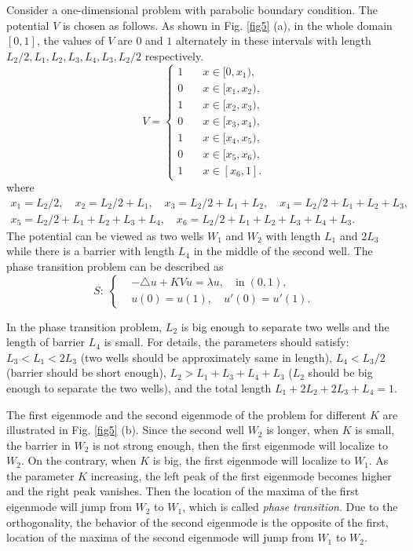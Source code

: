 \documentclass[a4paper,11pt]{article}
\begin{document}
Consider a one-dimensional problem with parabolic boundary condition. The potential $V$ is chosen as follows. As shown in Fig. \ref{fig5} (a), in the whole domain $[0,1]$, the values of $V$ are $0$ and $1$ alternately in these intervals with length $L_2/2, L_1, L_2, L_3, L_4, L_3, L_2/2$ respectively.
\begin{equation}
V = \left\{
\begin{split}
1 & \quad x \in [0, x_1), \\
0 & \quad x \in [x_1, x_2), \\
1 & \quad x \in [x_2, x_3), \\
0 & \quad x \in [x_3, x_4), \\
1 & \quad x \in [x_4, x_5), \\
0 & \quad x \in [x_5, x_6), \\
1 & \quad x \in [x_6, 1].
\end{split}
\right.
\end{equation}
where
\begin{equation}
\begin{split}
x_1 = L_2/2, \quad x_2 = L_2/2 + L_1, \quad x_3 = L_2/2 + L_1 + L_2, \quad x_4 = L_2/2 + L_1 + L_2 + L_3, \\
x_5 = L_2/2 + L_1 + L_2 + L_3 + L_4, \quad x_6 = L_2/2 + L_1 + L_2 + L_3 + L_4 + L_3.
\end{split}
\end{equation}
The potential can be viewed as two wells $W_1$ and $W_2$ with length $L_1$ and $2 L_3$ while there is a barrier with length $L_4$ in the middle of the second well. The phase transition problem can be described as
\begin{equation}
S: \;
\left\{
\begin{split}
& -\triangle u + K V u = \lambda u, \quad \textrm{in} \; (0, 1), \\
& u(0) = u(1), \quad u'(0) =  u'(1).
\end{split}
\right.
\end{equation}

In the phase transition problem, $L_2$ is big enough to separate two wells and the length of barrier $L_4$ is small. For details, the parameters should satisfy: $L_3 < L_1 < 2 L_3$ (two wells should be approximately same in length), $L_4 < L_3 / 2$ (barrier should be short enough), $L_2 > L_1+ L_3 + L_4 + L_3$ ($L_2$ should be big enough to separate the two wells), and the total length $L_1 + 2 L_2 + 2L_3 + L_4 = 1$.

The first eigenmode and the second eigenmode of the problem for different $K$ are illustrated in Fig. \ref{fig5} (b). Since the second well $W_2$ is longer, when $K$ is small, the barrier in $W_2$ is not strong enough, then the first eigenmode will localize to $W_2$. On the contrary, when $K$ is big, the first eigenmode will localize to $W_1$. As the parameter $K$ increasing, the left peak of the first eigenmode becomes higher and the right peak vanishes. Then the location of the maxima of the first eigenmode will jump from $W_2$ to $W_1$, which is called \emph{phase transition}. Due to the orthogonality, the behavior of the second eigenmode is the opposite of the first, location of the maxima of the second eigenmode will jump from $W_1$ to $W_2$.
\end{document}
